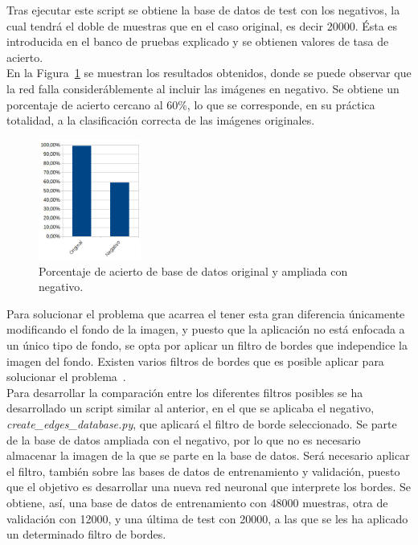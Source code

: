Tras ejecutar este script se obtiene la base de datos de test con los negativos, la cual tendrá el doble de muestras que en el caso original, es decir 20000. Ésta es introducida en el banco de pruebas explicado y se obtienen valores de tasa de acierto.\\

En la Figura~\ref{fig.neg-orig} se muestran los resultados obtenidos, donde se puede observar que la red falla consideráblemente al incluir las imágenes en negativo. Se obtiene un porcentaje de acierto cercano al 60\%, lo que se corresponde, en su práctica totalidad, a la clasificación correcta de las imágenes originales.

\begin{figure}[H]
	\begin{center}
		\includegraphics[width=0.3\textwidth]{figures/orig_neg}
		\caption{Porcentaje de acierto de base de datos original y ampliada con negativo.}
		\label{fig.neg-orig}
	\end{center}
\end{figure}

Para solucionar el problema que acarrea el tener esta gran diferencia únicamente modificando el fondo de la imagen, y puesto que la aplicación no está enfocada a un único tipo de fondo, se opta por aplicar un filtro de bordes que independice la imagen del fondo. Existen varios filtros de bordes que es posible aplicar para solucionar el problema~\cite{fundamentos}.\\

Para desarrollar la comparación entre los diferentes filtros posibles se ha desarrollado un script similar al anterior, en el que se aplicaba el negativo, \textit{create\_edges\_database.py}, que aplicará el filtro de borde seleccionado. Se parte de la base de datos ampliada con el negativo, por lo que no es necesario almacenar la imagen de la que se parte en la base de datos. Será necesario aplicar el filtro, también sobre las bases de datos de entrenamiento y validación, puesto que el objetivo es desarrollar una nueva red neuronal que interprete los bordes. Se obtiene, así, una base de datos de entrenamiento con 48000 muestras, otra de validación con 12000, y una última de test con 20000, a las que se les ha aplicado un determinado filtro de bordes.\\

